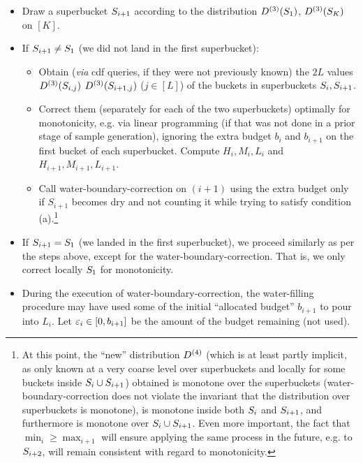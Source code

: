 \begin{itemize}
  \item Draw a superbucket $S_{i+1}$ according to the distribution $D^{(3)}(S_1)$, $D^{(3)}(S_K)$ on $[K]$.
    \item If $S_{i+1} \neq S_1$ (we did not land in the first superbucket):
  \begin{itemize}
    \item Obtain (\textit{via} cdf queries, if they were not previously known) the $2L$ values  $D^{(3)}(S_{i,j})$ $D^{(3)}(S_{i+1,j})$ ($j\in[L]$) of the buckets in superbuckets $S_{i},S_{i+1}$.
    \item Correct them (separately for each of the two superbuckets) optimally for monotonicity, e.g. via linear programming (if that was not done in a prior stage of sample generation), {ignoring} the extra budget $b_{i}$ and $b_{i+1}$ on the first bucket of each superbucket. Compute $H_i,M_i,L_i$ and $H_{i+1},M_{i+1},L_{i+1}$.
    \item Call \textsf{water-boundary-correction} on $(i+1)$ {using the extra budget only if $S_{i+1}$ becomes dry and not counting it while trying to satisfy condition \textsf{(a)}.}\footnote{At this point, the ``new'' distribution $D^{(4)}$ (which is at least partly implicit, as only known at a very coarse level over superbuckets and locally for some buckets inside $S_i\cup S_{i+1}$) obtained is monotone over the superbuckets (\textsf{water-boundary-correction} does not violate the invariant that the distribution over superbuckets is monotone), is monotone inside both $S_i$ and $S_{i+1}$, and furthermore is monotone over $S_i\cup S_{i+1}$. Even more important, the fact that $\min_i \geq \max_{i+1}$ will ensure applying the same process in the future, e.g. to $S_{i+2}$, will remain consistent with regard to monotonicity.}
  \end{itemize}
  \item {If $S_{i+1} = S_1$ (we landed in the first superbucket), we proceed similarly as per the steps above, except for the \textsf{water-boundary-correction}. That is, we only correct locally $S_1$ for monotonicity.}
  \item During the execution of \textsf{water-boundary-correction}, the water-filling procedure may have used some of the initial ``allocated budget'' $b_{i+1}$ to pour into $L_i$. Let $\varepsilon_i \in [0,b_{i+1}]$ be the amount of the budget remaining (not used).
  { 
  \begin{itemize}

\end{itemize}}
\end{itemize}
